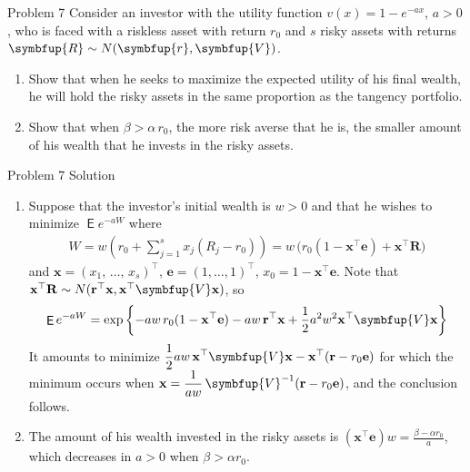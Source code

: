 \documentclass[10pt,handout]{beamer}
\newcommand{\ds}{\displaystyle}
\newcommand{\vR}{\symbfup{R}}
\newcommand{\vV}{\symbfup{V}}
\newcommand{\vr}{\symbfup{r}}
\DeclareMathOperator\expc{\mathsf{E}}
\theoremstyle{definition}
\begin{document}
\begin{frame}{Problem 7}
  Consider an investor with the utility function $v(x) = 1 - e^{-ax}$, $a > 0$, who is faced with a riskless asset with return $r_0$ and $s$ risky assets with returns $\vR\sim N(\vr, \vV)$. 
  \begin{enumerate}
    \item Show that when he seeks to maximize the expected utility of his final wealth, he will hold the risky assets in the same proportion as the tangency portfolio.
    \item Show that when $\beta > \alpha\,r_0$, the more risk averse that he is, the smaller amount of his wealth that he invests in the risky assets.
  \end{enumerate}
\end{frame}

\begin{frame}{Problem 7 Solution}
  \begin{enumerate}
    \item Suppose that the investor's initial wealth is $w > 0$ and that he wishes to minimize $\expc{e^{-aW}}$ where
      \begin{align*}
        W = w\left(r_0 + \sum_{j=1}^s x_j(R_j - r_0)\right) = w\,\big(r_0(1-\mathbf{x}^\top\mathbf{e}) + \mathbf{x}^\top\mathbf{R}\big)
      \end{align*}
      and $\mathbf{x} = (x_1,\,\ldots,\,x_s)^\top$, $\mathbf{e} = (1,\ldots,1)^\top$, $x_0 = 1 - \mathbf{x}^\top\mathbf{e}$. Note that $\mathbf{x}^\top\mathbf{R}\sim N(\mathbf{r}^\top\mathbf{x}, \mathbf{x}^\top\vV\mathbf{x})$, so 
      \begin{align*}
        \expc{e^{-aW}} = \exp\left\{-aw\,r_0(1-\mathbf{x}^\top\mathbf{e}) - aw\,\mathbf{r}^\top\mathbf{x} + \frac{1}{2}a^2w^2\mathbf{x}^\top\vV\mathbf{x}\right\}
      \end{align*}
      It amounts to minimize $\ds\frac{1}{2}aw\,\mathbf{x}^\top\vV\mathbf{x} - \mathbf{x}^\top(\mathbf{r} - r_0\mathbf{e})$ for which the minimum occurs when $\ds\mathbf{x} = \frac{1}{aw}\,\vV^{-1}(\mathbf{r} - r_0\mathbf{e})$, and the conclusion follows. 
    \item The amount of his wealth invested in the risky assets is $\ds(\mathbf{x}^\top\mathbf{e})w = \frac{\beta - \alpha r_0}{a}$, which decreases in $a > 0$ when $\beta > \alpha r_0$.
  \end{enumerate}
\end{frame}
\end{document}
